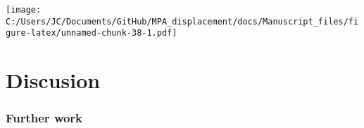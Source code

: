 \documentclass[]{article}
\theoremstyle{definition}
\theoremstyle{definition}
\theoremstyle{definition}
\theoremstyle{remark}
\begin{document}
\texttt{[image: C:/Users/JC/Documents/GitHub/MPA\_displacement/docs/Manuscript\_files/figure-latex/unnamed-chunk-38-1.pdf]}

\section{Discusion}\label{discusion}

\clearpage

\subsubsection{Further work}\label{further-work}

\renewcommand\refname{References}

\end{document}
